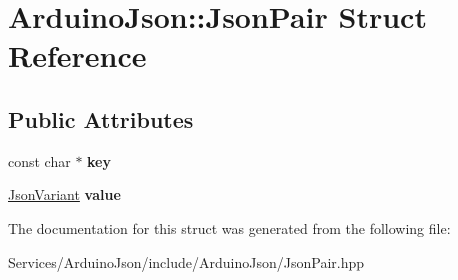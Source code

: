 \hypertarget{struct_arduino_json_1_1_json_pair}{}\section{Arduino\+Json\+:\+:Json\+Pair Struct Reference}
\label{struct_arduino_json_1_1_json_pair}
\subsection*{Public Attributes}
\begin{DoxyCompactItemize}
\item 
\hypertarget{struct_arduino_json_1_1_json_pair_adce629ace0a4624d68fc457bb3de3bfa}{}const char $\ast$ {\bfseries key}\label{struct_arduino_json_1_1_json_pair_adce629ace0a4624d68fc457bb3de3bfa}

\item 
\hypertarget{struct_arduino_json_1_1_json_pair_a77395ae9e49e004ef3733fda5a0a4854}{}\hyperlink{class_arduino_json_1_1_json_variant}{Json\+Variant} {\bfseries value}\label{struct_arduino_json_1_1_json_pair_a77395ae9e49e004ef3733fda5a0a4854}

\end{DoxyCompactItemize}


The documentation for this struct was generated from the following file\+:\begin{DoxyCompactItemize}
\item 
Services/\+Arduino\+Json/include/\+Arduino\+Json/Json\+Pair.\+hpp\end{DoxyCompactItemize}
